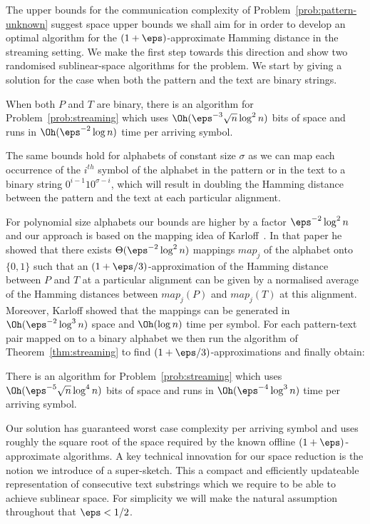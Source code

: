 The upper bounds for the communication complexity of Problem~\ref{prob:pattern-unknown} suggest space upper bounds we shall aim for in order to develop an optimal algorithm for the $(1+\eps)$-approximate Hamming distance in the streaming setting. We make the first step towards this direction and show two randomised sublinear-space algorithms for the problem. We start by giving a solution for the case when both the pattern and the text are binary strings.  

\begin{theorem}\label{thm:streaming}
When both $P$ and $T$ are binary, there is an algorithm for Problem~\ref{prob:streaming} which uses $\Oh(\eps^{-3} \sqrt{n} \log^{2} n)$ bits of space and runs in $\Oh(\eps^{-2} \log{n})$ time per arriving symbol.
\end{theorem}

The same bounds hold for alphabets of constant size $\sigma$ as we can map each occurrence of the $i^{th}$ symbol of the alphabet in the pattern or in the text to a binary string $0^{i-1} 1 0^{\sigma-i}$, which will result in doubling the Hamming distance between the pattern and the text at each particular alignment. 

For polynomial size alphabets our bounds are higher by a factor $\eps^{-2} \log^2 n$ and our approach is based on the mapping idea of Karloff~\cite{Karloff:1993}. In that paper he showed that there exists $\Theta(\eps^{-2} \log^2 n)$ mappings $map_j$ of the alphabet onto $\{0,1\}$ such that an $(1+\eps/3)$-approximation of the Hamming distance between $P$ and $T$ at a particular alignment can be given by a normalised average of the Hamming distances between $map_j(P)$ and $map_j(T)$ at this alignment. Moreover, Karloff showed that the mappings can be generated in $\Oh (\eps^{-2} \log^3 n)$ space and $\Oh (\log n)$ time per symbol. For each pattern-text pair mapped on to a binary alphabet we then run the algorithm of Theorem~\ref{thm:streaming} to find $(1+\eps/3)$-approximations and finally obtain: 

\begin{theorem}
There is an algorithm for Problem~\ref{prob:streaming} which uses $\Oh(\eps^{-5} \sqrt{n} \log^{4} n)$ bits of space and runs in $\Oh(\eps^{-4} \log^3 {n})$ time per arriving symbol.
\end{theorem}

Our solution has guaranteed worst case complexity per arriving symbol and uses roughly the square root of the space required by the known offline $(1+\eps)$-approximate algorithms. A key technical innovation for our space reduction is the notion we introduce of a super-sketch. This a compact and efficiently updateable representation of consecutive text substrings which we require to be able to achieve sublinear space.  For simplicity we will make the natural assumption throughout that  $\eps < 1/2$.

